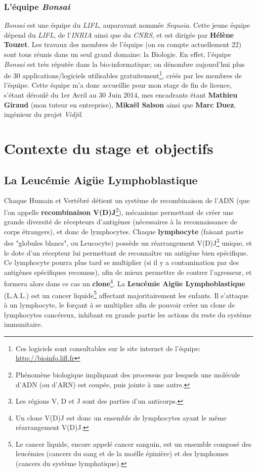 \documentclass[pdftex,12pt,a4paper]{report}
\begin{document}
\begin{spacing}{1.2}
\subsection{L'équipe \textit{Bonsai}}
\textit{Bonsai} est une équipe du \textit{LIFL}, auparavant nommée \textit{Sequoia}.
Cette jeune équipe dépend du \textit{LIFL}, de l'\textit{INRIA} ainsi que du \textit{CNRS}, et est dirigée par \textbf{Hélène Touzet}.
\newline
Les travaux des membres de l'équipe (on en compte actuellement 22) sont tous réunis dans un seul grand domaine: la Biologie.
En effet, l'équipe \textit{Bonsai} est très réputée dans la bio-informatique; on dénombre aujourd'hui plus de 30 applications/logiciels utilisables gratuitement\footnote{Ces logiciels sont consultables sur le site internet de l'équipe: \url{http://bioinfo.lifl.fr}}, créés par les membres de l'équipe.
\newline
Cette équipe m'a donc accueillie pour mon stage de fin de licence, s'étant déroulé du 1er Avril au 30 Juin 2014, mes encadrants étant \textbf{Mathieu Giraud} (mon tuteur en entreprise), \textbf{Mikaël Salson} ainsi que \textbf{Marc Duez}, ingénieur du projet \textit{Vidjil}.


\chapter{Contexte du stage et objectifs}

\section{La Leucémie Aigüe Lymphoblastique}

Chaque Humain et Vertébré détient un système de recombinaison de l'ADN (que l'on appelle \textbf{recombinaison V(D)J}\footnote{Phénomène biologique impliquant des processus par lesquels une molécule d'ADN (ou d'ARN) est coupée, puis jointe à une autre.}), mécanisme permettant de créer une grande diversité de récepteurs d'antigènes (nécessaires à la reconnaissance de corps étrangers), et donc de lymphocytes.
Chaque \textbf{lymphocyte} (faisant partie des "globules blancs", ou Leucocyte) possède un réarrangement V(D)J\footnote{Les régions V, D et J sont des parties d'un anticorps.} unique, et le dote d'un récepteur lui permettant de reconnaître un antigène bien spécifique. Ce lymphocyte pourra plus tard se multiplier (si il y a contamination par des antigènes spécifiques reconnus), afin de mieux permettre de contrer l'agresseur, et formera alors dans ce cas un \textbf{clone}\footnote{Un clone V(D)J est donc un ensemble de lymphocytes ayant le même réarrangement V(D)J.}.
\newline
La \textbf{Leucémie Aigüe Lymphoblastique} (L.A.L.) est un cancer liquide\footnote{Le cancer liquide, encore appelé cancer sanguin, est un ensemble composé des leucémies (cancers du sang et de la moëlle épinière) et des lymphomes (cancers du système lymphatique).} affectant majoritairement les enfants. Il s'attaque à un lymphocyte, le forçant à se multiplier afin de pouvoir créer un clone de lymphocytes cancéreux, inhibant en grande partie les actions du reste du système immunitaire.


\end{spacing}
\end{document}
